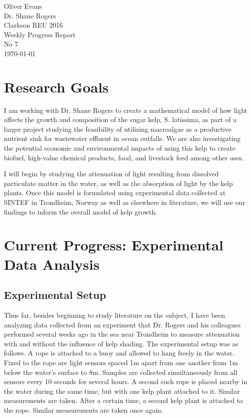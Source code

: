 \documentclass{article}
\begin{document}
\noindent
Oliver Evans \\
Dr. Shane Rogers \\
Clarkson REU 2016 \\
Weekly Progress Report \\
No 7 \\
\today \\

\section{Research Goals}

I am working with Dr. Shane Rogers to create a mathematical model of how light affects the growth and composition of the sugar kelp, S. latissima, as part of a larger project studying the feasibility of utilizing macroalgae as a productive nutrient sink for wastewater effluent in ocean outfalls. We are also investigating the potential economic and environmental impacts of using this kelp to create biofuel, high-value chemical products, food, and livestock feed among other uses.

I will begin by studying the attenuation of light resulting from dissolved particulate matter in the water, as well as the absorption of light by the kelp plants. Once this model is formulated using experimental data collected at SINTEF in Trondheim, Norway as well as elsewhere in literature, we will use our findings to inform the overall model of kelp growth.

\section{Current Progress: Experimental Data Analysis}

\subsection{Experimental Setup}
Thus far, besides beginning to study literature on the subject, I have been analyzing data collected from an experiment that Dr. Rogers and his colleagues performed several weeks ago in the sea near Trondheim to measure attenuation with and without the influence of kelp shading. The experimental setup was as follows. A rope is attached to a buoy and allowed to hang freely in the water. Fixed to the rope are light sensors spaced 1m apart from one another from 1m below the water's surface to 8m. Samples are collected simultaneously from all sensors every 10 seconds for several hours. A second such rope is placed nearby in the water during the same time, but with one kelp plant attached to it. Similar measurements are taken. After a certain time, a second kelp plant is attached to the rope. Similar measurements are taken once again.
\end{document}

